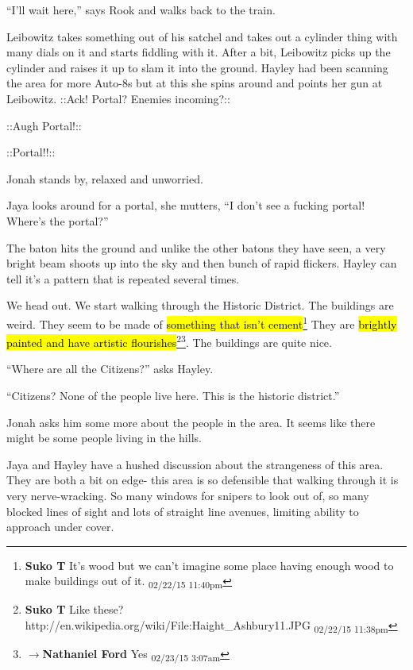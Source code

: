 ``I'll wait here,'' says Rook and walks back to the train.

Leibowitz takes something out of his satchel and takes out a cylinder thing with many dials on it and starts fiddling with it.  After a bit, Leibowitz picks up the cylinder and raises it up to slam it into the ground.  Hayley had been scanning the area for more Auto-8s but at this she spins around and points her gun at Leibowitz.   {\color[RGB]{255,153,0}::Ack!  Portal?  Enemies incoming?::} 

 {\color[RGB]{153,0,255}::Augh Portal!::} 

 {\color[RGB]{74,134,232}::Portal!!::} 

Jonah stands by, relaxed and unworried. 

Jaya looks around for a portal, she mutters, ``I don't see a fucking portal!  Where's the portal?''

The baton hits the ground and unlike the other batons they have seen, a very bright beam shoots up into the sky and then bunch of rapid flickers.  Hayley can tell it's a pattern that is repeated several times.





We head out.  We start walking through the Historic District.  The buildings are weird.  They seem to be made of \hl{something that isn't cement}\footnote{\textbf{Suko T }It's wood but we can't imagine some place having enough wood to make buildings out of it. \textsubscript{02/22/15 11:40pm}} They are \hl{brightly painted and have artistic flourishes}\footnote{\textbf{Suko T }Like these?
http://en.wikipedia.org/wiki/File:Haight\_Ashbury11.JPG \textsubscript{02/22/15 11:38pm}}\footnote{$\rightarrow$\textbf{Nathaniel Ford }Yes \textsubscript{02/23/15 3:07am}}. The buildings are quite nice.

``Where are all the Citizens?'' asks Hayley.

``Citizens?  None of the people live here. This is the historic district.''

Jonah asks him some more about the people in the area. It seems like there might be some people living in the hills.  

Jaya and Hayley have a hushed discussion about the strangeness of this area. They are both a bit on edge- this area is so defensible that walking through it is very nerve-wracking.  So many windows for snipers to look out of, so many blocked lines of sight and lots of straight line avenues, limiting ability to approach under cover.



